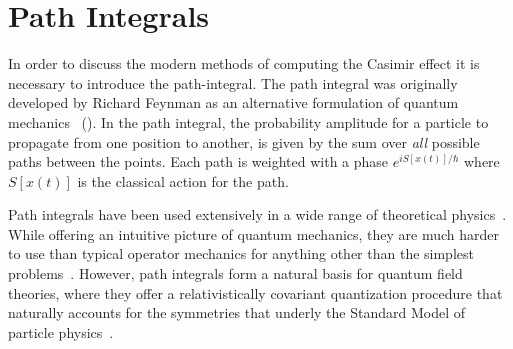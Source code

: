 

\section{Path Integrals}
\label{sec:feynman_path_integral}
In order to discuss the modern methods of computing the Casimir effect it is necessary to introduce
the path-integral. The path integral was originally developed by Richard Feynman as an alternative formulation of quantum mechanics
~(\cite{Feynman1948,Feynman1965}).  
In the path integral, the probability amplitude for a particle to propagate from one position to another,
is given by the sum over \emph{all} possible paths between the points.  
Each path is weighted with a phase $e^{iS[x(t)]/\hbar}$ where $S[x(t)]$ is the classical action for the path.


    Path integrals have been used extensively in a wide range of theoretical physics~\cite{Kleinert2012}.
    While offering an intuitive picture of quantum mechanics, they are much harder to use 
    than typical operator mechanics for anything other than the simplest problems~\cite{Feynman1965}.
    However, path integrals form a natural basis for quantum field theories, where they offer a relativistically covariant
    quantization procedure that naturally accounts for the symmetries 
    that underly the Standard Model of particle physics~\cite{Brown1994,Srednicki2008}.

